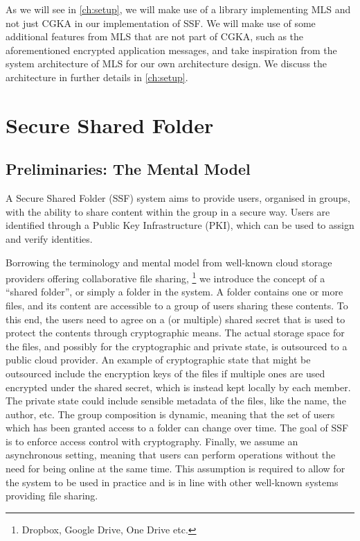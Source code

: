 As we will see in \cref{ch:setup}, we will make use of a library implementing MLS and not just CGKA in our implementation of SSF.
We will make use of some additional features from MLS that are not part of CGKA, such as the
aforementioned encrypted application messages,
and take inspiration from the system architecture of MLS for our own architecture design.
We discuss the architecture in further details in \cref{ch:setup}.

\section{Secure Shared Folder}\label{sc:SSF}

\subsection{Preliminaries: The Mental Model}\label{sc:mental-model}

A Secure Shared Folder (SSF) system aims to provide users, organised in groups, 
with the ability to share content within the group in a secure way.
Users are identified through a Public Key Infrastructure (PKI),
which can be used to assign and verify identities.

Borrowing the terminology and mental model from well-known cloud storage providers offering collaborative file sharing, 
\footnote{Dropbox, Google Drive, One Drive etc.}
we introduce the concept of a ``shared folder'', or simply a folder in the system.
A folder contains one or more files, and its content are accessible to a group of users sharing these contents.
To this end, the users need to agree on a (or multiple) shared secret that is used to protect the contents through cryptographic means.
The actual storage space for the files, and possibly for the cryptographic and private state, is outsourced to a public cloud provider.
An example of cryptographic state that might be outsourced include the encryption keys of the files if multiple ones are used encrypted under the
shared secret, which is instead kept locally by each member. The private state could include sensible metadata of the files,
like the name, the author, etc.
The group composition is dynamic, meaning that the set of users which has been granted access to a folder can change over time.
The goal of SSF is to enforce access control with cryptography.
Finally, we assume an asynchronous setting, meaning that users can
perform operations without the need for being online at the same time.
This assumption is required to allow for the system to be used in practice
and is in line with other well-known systems providing file sharing.

